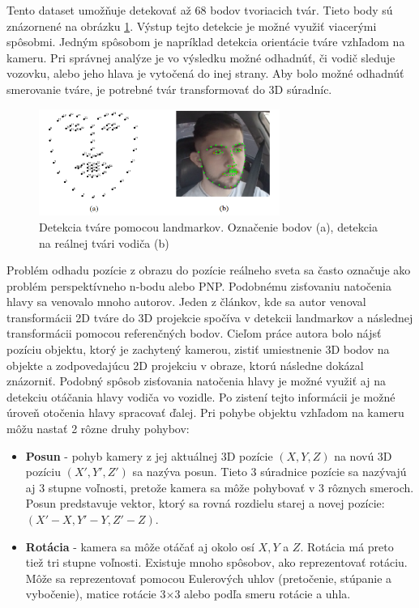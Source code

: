\documentclass[slovak,master,dept460,male,cpp,cpdeclaration]{diploma}
\begin{document}
Tento dataset  umožňuje detekovať až 68 bodov tvoriacich tvár. Tieto body sú znázornené na obrázku \ref{fig:landmarks}. Výstup tejto detekcie je možné využiť viacerými spôsobmi. Jedným spôsobom je napríklad detekcia orientácie tváre vzhľadom na kameru. Pri správnej analýze je vo výsledku možné odhadnúť, či vodič sleduje vozovku, alebo jeho hlava je vytočená do inej strany. Aby bolo možné odhadnúť smerovanie tváre, je potrebné tvár transformovať do 3D súradníc.

\begin{figure}[H]
	\centering
	\includegraphics[width=0.7\textwidth]{Figures/landmarks.png}
	\caption{Detekcia tváre pomocou landmarkov. Označenie  bodov (a), detekcia na reálnej tvári vodiča (b)}
	\label{fig:landmarks}
\end{figure}


Problém odhadu pozície z obrazu do pozície reálneho sveta sa často označuje ako problém perspektívneho n-bodu alebo PNP. Podobnému zisťovaniu  natočenia hlavy sa venovalo mnoho autorov. Jeden z článkov\cite{mallick}, kde  sa autor venoval transformácii 2D tváre do 3D projekcie spočíva v detekcii landmarkov a následnej transformácii pomocou referenčných bodov. Cieľom práce autora bolo nájsť pozíciu objektu, ktorý je zachytený kamerou, zistiť umiestnenie 3D bodov na objekte a zodpovedajúcu 2D projekciu v obraze, ktorú následne dokázal znázorniť. Podobný spôsob zisťovania natočenia hlavy je možné využiť aj na detekciu otáčania hlavy vodiča vo vozidle. Po zistení tejto informácii je možné úroveň otočenia hlavy spracovať ďalej. Pri pohybe objektu vzhľadom na kameru môžu nastať 2 rôzne druhy pohybov:
\begin{itemize}
\item\textbf{Posun} - pohyb kamery z jej aktuálnej 3D pozície $(X, Y, Z)$ na novú 3D pozíciu $(X ', Y', Z ')$ sa nazýva posun. Tieto 3 súradnice pozície sa nazývajú aj 3 stupne voľnosti, pretože kamera sa môže pohybovať v 3 rôznych smeroch. Posun predstavuje vektor, ktorý sa rovná rozdielu starej a novej pozície:  $(X '- X, Y' - Y, Z '- Z)$.
\item\textbf{Rotácia} - kamera sa môže otáčať aj okolo osí $X, Y$ a $Z$. Rotácia má preto tiež tri stupne voľnosti. Existuje mnoho spôsobov, ako reprezentovať rotáciu. Môže sa reprezentovať pomocou Eulerových uhlov (pretočenie, stúpanie a vybočenie), matice rotácie 3$\times$3 alebo podľa smeru rotácie a uhla.
\end{itemize}
\end{document}
